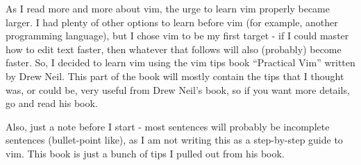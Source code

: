 As I read more and more about vim, the urge to learn vim properly became larger.
I had plenty of other options to learn before vim (for example, another programming language), but I chose vim to be my first target - if I could master how to edit text faster, then whatever that follows will also (probably) become faster.
So, I decided to learn vim using the vim tips book ``Practical Vim'' written by Drew Neil.
This part of the book will mostly contain the tips that I thought was, or could be, very useful from Drew Neil's book, so if you want more details, go and read his book.

Also, just a note before I start - most sentences will probably be incomplete sentences (bullet-point like), as I am not writing this as a step-by-step guide to vim.
This book is just a bunch of tips I pulled out from his book.
